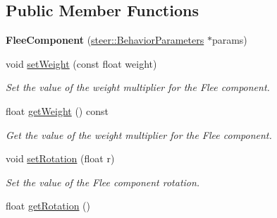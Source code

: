 \subsection*{Public Member Functions}
\begin{DoxyCompactItemize}
\item 
\hypertarget{classsteer_1_1_flee_component_a5d22713dafeafb40c1bbb7ef0c407ad3}{{\bfseries Flee\-Component} (\hyperlink{structsteer_1_1_behavior_parameters}{steer\-::\-Behavior\-Parameters} $\ast$params)}\label{classsteer_1_1_flee_component_a5d22713dafeafb40c1bbb7ef0c407ad3}

\item 
void \hyperlink{classsteer_1_1_flee_component_a8a0351ac86dae827867267d4e66b85ed}{set\-Weight} (const float weight)
\begin{DoxyCompactList}\small\item\em Set the value of the weight multiplier for the Flee component. \end{DoxyCompactList}\item 
\hypertarget{classsteer_1_1_flee_component_a461a45118d51c7fece0becca6b006311}{float \hyperlink{classsteer_1_1_flee_component_a461a45118d51c7fece0becca6b006311}{get\-Weight} () const }\label{classsteer_1_1_flee_component_a461a45118d51c7fece0becca6b006311}

\begin{DoxyCompactList}\small\item\em Get the value of the weight multiplier for the Flee component. \end{DoxyCompactList}\item 
\hypertarget{classsteer_1_1_flee_component_a271c3305229a8a6497ca30233ead31eb}{void \hyperlink{classsteer_1_1_flee_component_a271c3305229a8a6497ca30233ead31eb}{set\-Rotation} (float r)}\label{classsteer_1_1_flee_component_a271c3305229a8a6497ca30233ead31eb}

\begin{DoxyCompactList}\small\item\em Set the value of the Flee component rotation. \end{DoxyCompactList}\item 
\hypertarget{classsteer_1_1_flee_component_a2ec7a44b50c2afb647d7c47b0987e263}{float \hyperlink{classsteer_1_1_flee_component_a2ec7a44b50c2afb647d7c47b0987e263}{get\-Rotation} ()}\label{classsteer_1_1_flee_component_a2ec7a44b50c2afb647d7c47b0987e263}


\end{DoxyCompactItemize}
